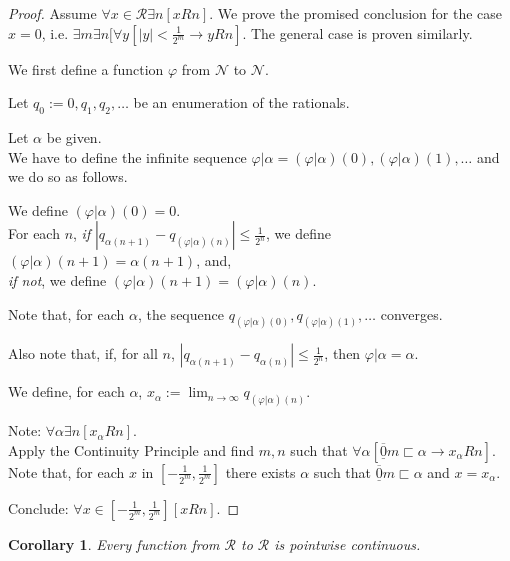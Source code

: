 \documentclass[a4paper]{amsart}
\theoremstyle{plain}
\newtheorem{corollary}[theorem]{Corollary}
\begin{document}
\begin{proof} Assume $\forall x\in \mathcal{R}\exists n[x Rn]$.  We prove the promised conclusion for the case $x=0$, i.e. $\exists m \exists n[\forall y[|y|<\frac{1}{2^m}\rightarrow yRn]$. The general case is proven similarly.

\smallskip
We first define a function $\varphi$ from $\mathcal{N}$ to $\mathcal{N}$.

\smallskip
Let $q_0:=0, q_1, q_2, \ldots$ be an enumeration of the rationals.

Let $\alpha$ be given. \\We have to define the infinite sequence $\varphi|\alpha= (\varphi|\alpha)(0), (\varphi|\alpha)(1), \ldots$ and we do so as follows.

We define $(\varphi|\alpha)(0)=0$. \\ For each $n$,  {\it if}  $|q_{\alpha(n+1)}-q_{(\varphi|\alpha)(n)}|\le \frac{1}{2^n}$, we define $(\varphi|\alpha)(n+1)= \alpha(n+1)$, and,  \\{\it if not}, we define $(\varphi|\alpha)(n+1)=(\varphi|\alpha)(n)$. 

Note that, for each $\alpha$, the sequence $q_{(\varphi|\alpha)(0)}, q_{(\varphi|\alpha)(1)}, \ldots$ converges.

Also note that, if, for all $n$, $|q_{\alpha(n+1)}-q_{\alpha(n)}|\le \frac{1}{2^n}$, then $\varphi|\alpha=\alpha$.

We define, for each $\alpha$, $x_\alpha:=\lim_{n\rightarrow\infty} q_{(\varphi|\alpha)(n)}$. 




Note: $\forall \alpha \exists n[x_\alpha Rn]$.\\ Apply the Continuity Principle and find $m,n$ such that  $\forall\alpha[\underline{\overline 0}m \sqsubset \alpha \rightarrow x_\alpha Rn]$. 
\\Note that,  for each $x$ in $[-\frac{1}{2^m}, \frac{1}{2^m}]$ there exists $\alpha$ such that $\overline{\underline 0}m\sqsubset \alpha$ and $x=x_\alpha$. 

 Conclude: $\forall x \in [-\frac{1}{2^m}, \frac{1}{2^m}][ x R n]$. \end{proof}

\begin{corollary}\label{C:contreal} Every function from $\mathcal{R}$ to $\mathcal{R}$ is pointwise continuous. \end{corollary}
\end{document}
